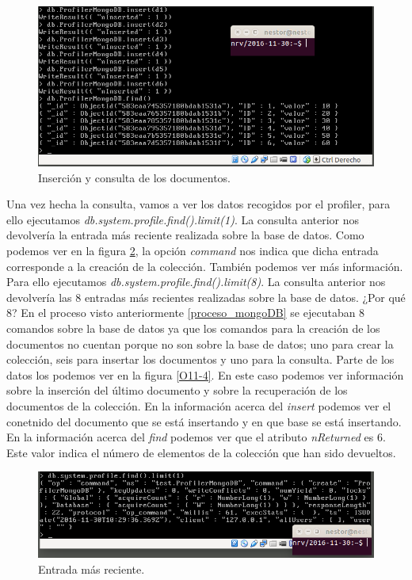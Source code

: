 \documentclass[a4paper,titlepage,12pt]{scrartcl}	%
\numberwithin{figure}{section} %
\numberwithin{table}{section} %
\begin{document}
	\begin{figure}[H]
		\includegraphics[width=\linewidth]{./Imagenes/O11-2.png}
		\vspace{-0.5cm}
		\caption[Inserción y consulta de los documentos.]{Inserción y consulta de los documentos.}
		\label{O11-2}
	\end{figure}
	
	Una vez hecha la consulta, vamos a ver los datos recogidos por el profiler, para ello ejecutamos \textit{db.system.profile.find().limit(1)}. La consulta anterior nos devolvería la entrada más reciente realizada sobre la base de datos. Como podemos ver en la figura \ref{O11-3}, la opción \textit{command} nos indica que dicha entrada corresponde a la creación de la colección. También podemos ver más información. Para ello ejecutamos \textit{db.system.profile.find().limit(8)}. La consulta anterior nos devolvería las 8 entradas más recientes realizadas sobre la base de datos. ¿Por qué 8? En el proceso visto anteriormente \ref{proceso_mongoDB} se ejecutaban 8 comandos sobre la base de datos ya que los comandos para la creación de los documentos no cuentan porque no son sobre la base de datos; uno para crear la colección, seis para insertar los documentos y uno para la consulta. Parte de los datos los podemos ver en la figura \ref{O11-4}. En este caso podemos ver información sobre la inserción del último documento y sobre la recuperación de los documentos de la colección. En la información acerca del \textit{insert} podemos ver el conetnido del documento que se está insertando y en que base se está insertando. En la información acerca del \textit{find} podemos ver que el atributo \textit{nReturned} es 6. Este valor indica el número de elementos de la colección que han sido devueltos.
	
	\begin{figure}[H]
		\includegraphics[width=\linewidth]{./Imagenes/O11-3.png}
		\vspace{-0.5cm}
		\caption[Entrada más reciente.]{Entrada más reciente.}
		\label{O11-3}
	\end{figure}
	
\end{document}
